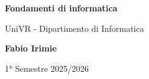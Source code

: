 \begin{titlepage}
	\begin{center}
		\vspace*{1cm}

		\Huge
		\textbf{Fondamenti di informatica}

		\vspace{0.5cm}
		\LARGE
		UniVR - Dipartimento di Informatica

		\vspace{1.5cm}

		\textbf{Fabio Irimie}

		\vfill


		\vspace{0.8cm}


		1° Semestre 2025/2026

	\end{center}
\end{titlepage}
